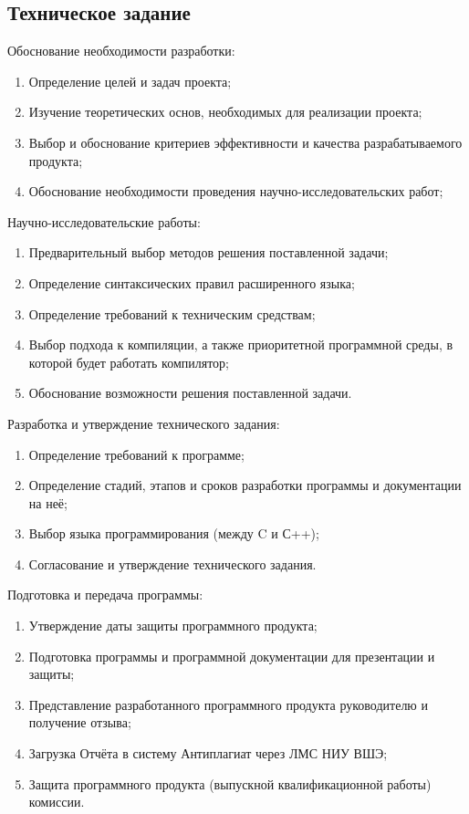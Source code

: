\subsection{Техническое задание}
Обоснование необходимости разработки:
\begin{enumerate}
  \item Определение целей и задач проекта;
  \item Изучение теоретических основ, необходимых для реализации проекта;
  \item Выбор и обоснование критериев эффективности и качества разрабатываемого продукта;
  \item Обоснование необходимости проведения научно-исследовательских работ;
\end{enumerate}
Научно-исследовательские работы:
\begin{enumerate}
  \item Предварительный выбор методов решения поставленной задачи;
  \item Определение синтаксических правил расширенного языка;
  \item Определение требований к техническим средствам;
  \item Выбор подхода к компиляции, а также приоритетной программной среды, в которой будет работать компилятор;
  \item Обоснование возможности решения поставленной задачи.
\end{enumerate}
Разработка и утверждение технического задания:
\begin{enumerate}
  \item Определение требований к программе;
  \item Определение стадий, этапов и сроков разработки программы и документации на неё;
  \item Выбор языка программирования (между C и С++);
  \item Согласование и утверждение технического задания.
\end{enumerate}
Подготовка и передача программы:
\begin{enumerate}
  \item Утверждение даты защиты программного продукта;
  \item Подготовка программы и программной документации для презентации и защиты;
  \item Представление разработанного программного продукта руководителю и получение отзыва;
  \item Загрузка Отчёта в систему Антиплагиат через ЛМС НИУ ВШЭ;
  \item Защита программного продукта (выпускной квалификационной работы) комиссии.
\end{enumerate}
